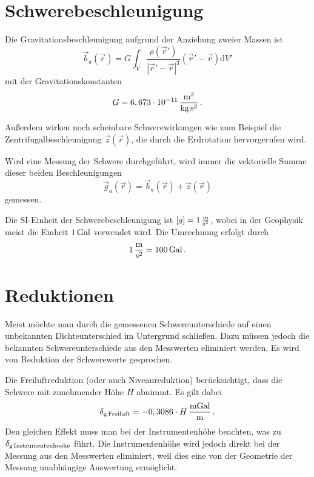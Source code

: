 \section{Schwerebeschleunigung}

Die Gravitationsbeschleunigung aufgrund der Anziehung zweier Massen ist
\begin{equation}
 \vec{b}_a(\vec{r})=G\int_V \frac{\rho(\vec{r}')}{|\vec{r}'-\vec{r}|^3}(\vec{r}'-\vec{r})\text{d}V'
\end{equation}
mit der Gravitationskonstanten
\begin{equation}
 G=6,673\cdot 10^{-11}\,\frac{\mathrm{m^3}}{\mathrm{kg\,s^2}} \text{\,.}
\end{equation}

Außerdem wirken noch scheinbare Schwerewirkungen wie zum Beispiel die Zentrifugalbeschleunigung $\vec{z}(\vec{r})$, die durch die Erdrotation hervorgerufen wird.

Wird eine Messung der Schwere durchgeführt, wird immer die vektorielle Summe dieser beiden Beschleunigungen
\begin{equation}
 \vec{g}_a(\vec{r})=\vec{b}_a(\vec{r})+\vec{z}(\vec{r})
\end{equation}
gemessen.

Die SI-Einheit der Schwerebeschleunigung ist $\left[g\right]=1\,\frac{\mathrm{m}}{\mathrm{s^2}}$, wobei in der Geophysik meist die Einheit $1\,\mathrm{Gal}$ verwendet wird. Die Umrechnung erfolgt durch
\begin{equation}
 1\,\frac{\mathrm{m}}{\mathrm{s^2}}=100\,\mathrm{Gal} \text{\,.}
\end{equation}

\section{Reduktionen}

Meist möchte man durch die gemessenen Schwereunterschiede auf einen unbekannten Dichteunterschied im Untergrund schließen. Dazu müssen jedoch die bekannten Schwereunterschiede aus den Messwerten eliminiert werden. Es wird von Reduktion der Schwerewerte gesprochen.

Die Freiluftreduktion (oder auch Niveaureduktion) berücksichtigt, dass die Schwere mit zunehmender Höhe $H$ abnimmt. Es gilt dabei
\begin{equation}
 \delta_{\mathrm{g\,Freiluft}}=-0,3086\cdot H\,\frac{\mathrm{mGal}}{\mathrm{m}} \text{\,.}
\end{equation}
Den gleichen Effekt muss man bei der Instrumentenhöhe beachten, was zu $\delta_{\mathrm{g\,Instrumentenhoehe}}$ führt. Die Instrumentenhöhe wird jedoch direkt bei der Messung aus den Messwerten eliminiert, weil dies eine von der Geometrie der Messung unabhängige Auswertung ermöglicht.

